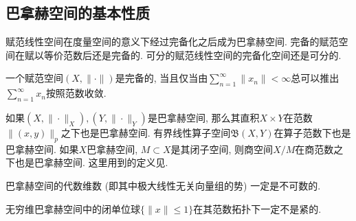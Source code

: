 \subsection{巴拿赫空间的基本性质}
赋范线性空间在度量空间的意义下经过完备化之后成为巴拿赫空间. 完备的赋范空间在赋以等价范数后还是完备的. 可分的赋范线性空间的完备化空间还是可分的. 

一个赋范空间$(X,\|\cdot\|)$是完备的, 当且仅当由$\sum _{n=1}^{\infty }\|x_{n}\|<\infty $总可以推出$\sum _{n=1}^{\infty }x_{n}$按照范数收敛.

如果$(X,\|\cdot\|_X),(Y,\|\cdot\|_Y)$是巴拿赫空间, 那么其直积$X\times Y$在范数$\|(x,y)\|_{p}$之下也是巴拿赫空间. 有界线性算子空间$\mathfrak{B}(X,Y)$在算子范数下也是巴拿赫空间. 如果$X$巴拿赫空间, $M\subset X$是其闭子空间, 则商空间$X/M$在商范数之下也是巴拿赫空间. 这里用到的定义见.

巴拿赫空间的代数维数 (即其中极大线性无关向量组的势) 一定是不可数的.

无穷维巴拿赫空间中的闭单位球$\{\|x\|\leq1\}$在其范数拓扑下一定不是紧的.

